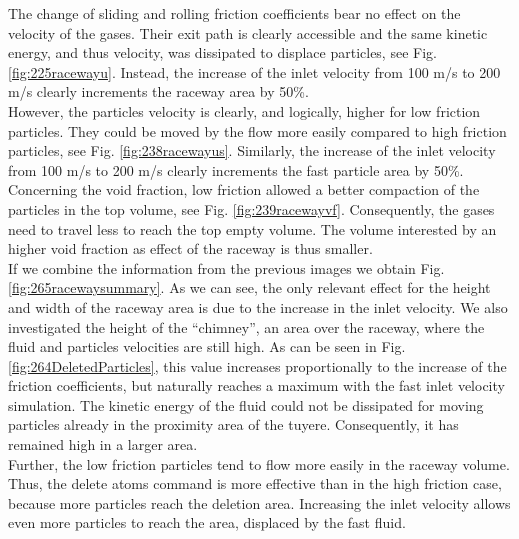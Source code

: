 The change of sliding and rolling friction coefficients bear no effect on the
velocity of the gases. 
Their exit path is clearly accessible and the same kinetic energy, and thus velocity, was
dissipated to displace particles, see Fig. \ref{fig:225racewayu}.
Instead, the increase of the inlet velocity from 100 m/s to 200 m/s clearly
increments the raceway area by 50\%.\\
However, the particles velocity is clearly, and logically, higher for low
friction particles. They could be moved by the flow more easily compared to high
friction particles, see Fig. \ref{fig:238racewayus}.
Similarly, the increase of the inlet velocity from 100 m/s to 200 m/s clearly
increments the fast particle area by 50\%.\\
Concerning the void fraction, low friction allowed a better compaction of the
particles in the top volume, see Fig. \ref{fig:239racewayvf}.
Consequently, the gases need to travel less to reach the top empty volume.
The volume interested by an higher void fraction as effect of the raceway is
thus smaller.\\
If we combine the information from the previous images we obtain Fig.
\ref{fig:265racewaysummary}.
As we can see, the only relevant effect for the height and width of the raceway
area is due to the increase in the inlet velocity. 
We also investigated the height of the ``chimney'', an area over the
raceway, where the fluid and particles velocities are still high.
As can be seen in Fig. \ref{fig:264DeletedParticles}, this value increases
proportionally to the increase of the friction coefficients, but naturally
reaches a maximum with the fast inlet velocity simulation.
The kinetic energy of the fluid could not be dissipated for moving particles
already in the proximity area of the tuyere.
Consequently, it has remained high in a larger area.\\
Further, the low friction particles tend to flow more easily in the raceway volume. 
Thus, the delete atoms command is more effective than in the high friction case,
because more particles reach the deletion area.
Increasing the inlet velocity allows even more particles to reach the area,
displaced by the fast fluid.










